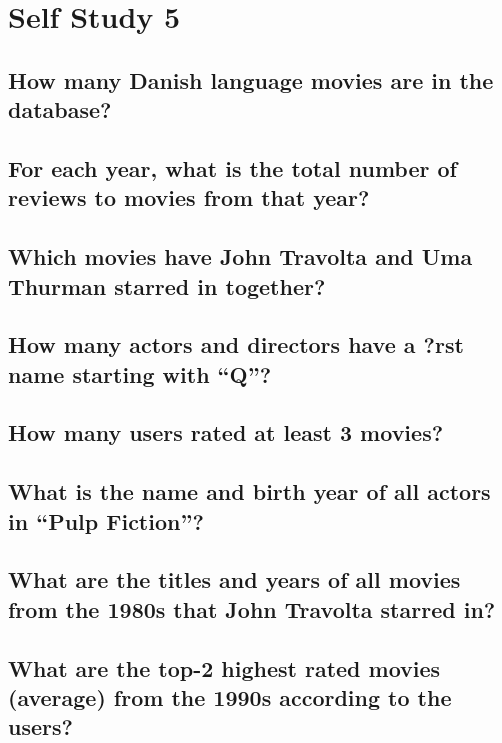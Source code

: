 \documentclass[a4paper,11pt]{memoir}
\begin{document}
\chapter{Self Study 5}

\section{How many Danish language movies are in the database?}


\section{For each year, what is the total number of reviews to movies from that year?}


\section{Which movies have John Travolta and Uma Thurman starred in together?}


\section{How many actors and directors have a ?rst name starting with ``Q''?}


\section{How many users rated at least 3 movies?}


\section{What is the name and birth year of all actors in ``Pulp Fiction''?}


\section{What are the titles and years of all movies from the 1980s that John Travolta starred in?}


\section{What are the top-2 highest rated movies (average) from the 1990s according to the users?}

\end{document}
